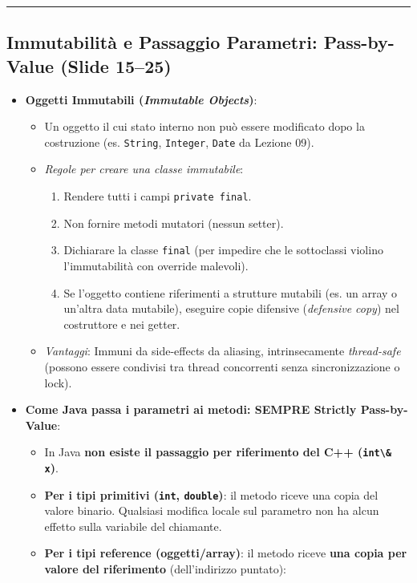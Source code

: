 \documentclass[11pt,a4paper,oneside]{report}
\newcommand{\passthrough}[1]{#1}
\providecommand{\tightlist}{\setlength{\itemsep}{0pt}\setlength{\parskip}{0pt}}
\begin{document}
\begin{center}\rule{0.5\linewidth}{0.5pt}\end{center}

\subsection{Immutabilità e Passaggio Parametri: Pass-by-Value (Slide
15--25)}\label{chap09_immutabilituxe0-e-passaggio-parametri-pass-by-value-slide-1525}

\begin{itemize}
\tightlist
\item
  \textbf{Oggetti Immutabili (\emph{Immutable Objects})}:

  \begin{itemize}
  \tightlist
  \item
    Un oggetto il cui stato interno non può essere modificato dopo la
    costruzione (es. \passthrough{\lstinline!String!},
    \passthrough{\lstinline!Integer!}, \passthrough{\lstinline!Date!} da
    Lezione 09).
  \item
    \emph{Regole per creare una classe immutabile}:

    \begin{enumerate}
    \def\labelenumi{\arabic{enumi}.}
    \tightlist
    \item
      Rendere tutti i campi \passthrough{\lstinline!private final!}.
    \item
      Non fornire metodi mutatori (nessun setter).
    \item
      Dichiarare la classe \passthrough{\lstinline!final!} (per impedire
      che le sottoclassi violino l'immutabilità con override malevoli).
    \item
      Se l'oggetto contiene riferimenti a strutture mutabili (es. un
      array o un'altra data mutabile), eseguire copie difensive
      (\emph{defensive copy}) nel costruttore e nei getter.
    \end{enumerate}
  \item
    \emph{Vantaggi}: Immuni da side-effects da aliasing, intrinsecamente
    \emph{thread-safe} (possono essere condivisi tra thread concorrenti
    senza sincronizzazione o lock).
  \end{itemize}
\item
  \textbf{Come Java passa i parametri ai metodi: SEMPRE Strictly
  Pass-by-Value}:

  \begin{itemize}
  \tightlist
  \item
    In Java \textbf{non esiste il passaggio per riferimento del C++
    (\passthrough{\lstinline!int\& x!})}.
  \item
    \textbf{Per i tipi primitivi (\passthrough{\lstinline!int!},
    \passthrough{\lstinline!double!})}: il metodo riceve una copia del
    valore binario. Qualsiasi modifica locale sul parametro non ha alcun
    effetto sulla variabile del chiamante.
  \item
    \textbf{Per i tipi reference (oggetti/array)}: il metodo riceve
    \textbf{una copia per valore del riferimento} (dell'indirizzo
    puntato):


\end{itemize}
\end{itemize}
\end{document}
